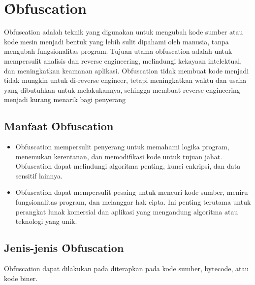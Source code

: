 \section{\f{Obfuscation}}
Obfuscation adalah teknik yang digunakan untuk mengubah kode sumber atau kode mesin menjadi bentuk yang lebih sulit dipahami oleh manusia, tanpa mengubah fungsionalitas program. Tujuan utama obfuscation adalah untuk mempersulit analisis dan reverse engineering, melindungi kekayaan intelektual, dan meningkatkan keamanan aplikasi. Obfuscation tidak membuat kode menjadi tidak mungkin untuk di-reverse engineer, tetapi meningkatkan waktu dan usaha yang dibutuhkan untuk melakukannya, sehingga membuat reverse engineering menjadi kurang menarik bagi penyerang

\subsection{Manfaat \f{Obfuscation}}
\begin{itemize}
	\item {} Obfuscation mempersulit penyerang untuk memahami logika program, menemukan kerentanan, dan memodifikasi kode untuk tujuan jahat. Obfuscation dapat melindungi algoritma penting, kunci enkripsi, dan data sensitif lainnya.
	\item {} Obfuscation dapat mempersulit pesaing untuk mencuri kode sumber, meniru fungsionalitas program, dan melanggar hak cipta. Ini penting terutama untuk perangkat lunak komersial dan aplikasi yang mengandung algoritma atau teknologi yang unik.
\end{itemize}

\subsection{Jenis-jenis \f{Obfuscation}}
Obfuscation dapat dilakukan pada diterapkan pada kode sumber, bytecode, atau kode biner.
